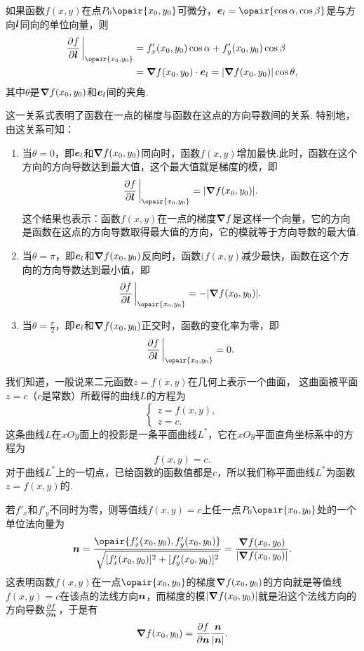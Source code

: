 \begin{theorem}\label{theorem:多元函数微分法.方向导数与梯度的关系}
如果函数\(f(x,y)\)在点\(P_0\opair{x_0,y_0}\)可微分，\(\mat{e}_l=\opair{\cos\alpha,\cos\beta}\)是与方向\(\boldsymbol{l}\)同向的单位向量，则\begin{equation}
\begin{split}
\pdv{f}{\mat{l}}\eval_{\opair{x_0,y_0}}
&= f'_x(x_0,y_0) \cos\alpha + f'_y(x_0,y_0) \cos\beta \\
&= \grad{f}(x_0,y_0) \cdot \mat{e}_l
= \abs{\grad{f}(x_0,y_0)} \cos\theta,
\end{split}
\end{equation}其中\(\theta\)是\(\grad{f}(x_0,y_0)\)和\(\boldsymbol{e}_l\)间的夹角.
\end{theorem}
这一关系式表明了函数在一点的梯度与函数在这点的方向导数间的关系.
特别地，由这关系可知：
\begin{enumerate}
\item 当\(\theta=0\)，即\(\boldsymbol{e}_l\)和\(\grad{f}(x_0,y_0)\)同向时，函数\(f(x,y)\)增加最快.此时，函数在这个方向的方向导数达到最大值，这个最大值就是梯度的模，即\[
\pdv{f}{\mat{l}}\eval_{\opair{x_0,y_0}} = \abs{\grad{f}(x_0,y_0)}.
\]这个结果也表示：函数\(f(x,y)\)在一点的梯度\(\grad{f}\)是这样一个向量，它的方向是函数在这点的方向导数取得最大值的方向，它的模就等于方向导数的最大值.

\item 当\(\theta=\pi\)，即\(\boldsymbol{e}_l\)和\(\grad{f}(x_0,y_0)\)反向时，函数\((f(x,y)\)减少最快，函数在这个方向的方向导数达到最小值，即\[
\pdv{f}{\mat{l}}\eval_{\opair{x_0,y_0}} = -\abs{\grad{f}(x_0,y_0)}.
\]

\item 当\(\theta=\frac{\pi}{2}\)，即\(\boldsymbol{e}_l\)和\(\grad{f}(x_0,y_0)\)正交时，函数的变化率为零，即\[
\pdv{f}{\mat{l}}\eval_{\opair{x_0,y_0}} = 0.
\]
\end{enumerate}

我们知道，一般说来二元函数\(z = f(x,y)\)在几何上表示一个曲面，
这曲面被平面\(z = c\)（\(c\)是常数）所截得的曲线\(L\)的方程为\[
\left\{ \begin{array}{l}
z = f(x,y), \\
z = c.
\end{array} \right.
\]这条曲线\(L\)在\(xOy\)面上的投影是一条平面曲线\(L^*\)，它在\(xOy\)平面直角坐标系中的方程为\[
f(x,y) = c.
\]对于曲线\(L^*\)上的一切点，已给函数的函数值都是\(c\)，所以我们称平面曲线\(L^*\)为函数\(z = f(x,y)\)的.

若\(f'_x\)和\(f'_y\)不同时为零，则等值线\(f(x,y) = c\)上任一点\(P_0\opair{x_0,y_0}\)处的一个单位法向量为\[
\mat{n}
= \frac{\opair{f'_x(x_0,y_0),f'_y(x_0,y_0)}}{\sqrt{[f'_x(x_0,y_0)]^2+[f'_y(x_0,y_0)]^2}}
= \frac{\grad f(x_0,y_0)}{\abs{\grad f(x_0,y_0)}}.
\]
这表明函数\(f(x,y)\)在一点\(\opair{x_0,y_0}\)的梯度\(\grad f(x_0,y_0)\)的方向就是等值线\(f(x,y) = c\)在该点的法线方向\(\boldsymbol{n}\)，而梯度的模\(\abs{\grad f(x_0,y_0)}\)就是沿这个法线方向的方向导数\(\pdv{f}{\boldsymbol{n}}\)，于是有\[
\grad f(x_0,y_0) = \pdv{f}{\boldsymbol{n}} \frac{\boldsymbol{n}}{\abs{\boldsymbol{n}}}.
\]

